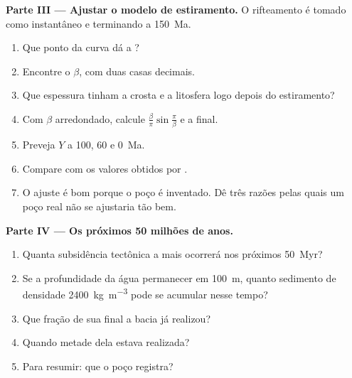 \begin{problem}
\noindent\textbf{Parte III --- Ajustar o modelo de estiramento.} O rifteamento é tomado como instantâneo
e terminando a \qty{150}{Ma}.
\begin{enumerate}[resume]
  \item Que ponto da curva dá a ?
  \item Encontre o  $\beta$, com duas casas decimais.
  \item Que espessura tinham a crosta e a litosfera logo depois do estiramento?
  \item Com $\beta$ arredondado, calcule $\frac{\beta}{\pi}\sin\frac{\pi}{\beta}$ e a  final.
  \item Preveja $Y$ a 100, 60 e \qty{0}{Ma}.
  \item Compare com os valores obtidos por .
  \item O ajuste é bom porque o poço é inventado. Dê três razões pelas quais um poço real não
        se ajustaria tão bem.
\end{enumerate}

\noindent\textbf{Parte IV --- Os próximos 50 milhões de anos.}
\begin{enumerate}[resume]
  \item Quanta subsidência tectônica a mais ocorrerá nos próximos \qty{50}{Myr}?
  \item Se a profundidade da água permanecer em \qty{100}{m}, quanto sedimento de densidade
        \qty{2400}{kg.m^{-3}} pode se acumular nesse tempo?
  \item Que fração de sua  final a bacia já realizou?
  \item Quando metade dela estava realizada?
  \item Para resumir: que  o poço registra?
\end{enumerate}
\end{problem}
